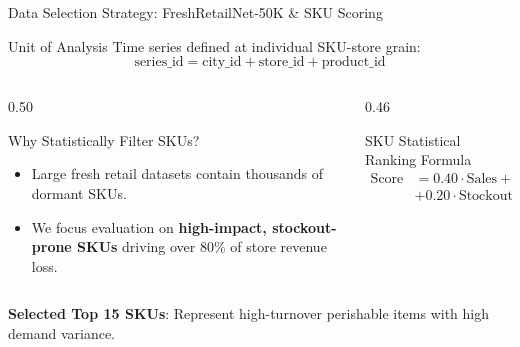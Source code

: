 \documentclass[10pt, aspectratio=169]{beamer}
\begin{document}
\begin{frame}{Data Selection Strategy: FreshRetailNet-50K \& SKU Scoring}
  \begin{block}{Unit of Analysis}
    Time series defined at individual SKU-store grain: 
    $$\text{series\_id} = \text{city\_id} + \text{store\_id} + \text{product\_id}$$
  \end{block}

  \begin{columns}[T]
    \begin{column}{0.50\textwidth}
      \begin{block}{Why Statistically Filter SKUs?}
        \begin{itemize}
          \item Large fresh retail datasets contain thousands of dormant SKUs.
          \item We focus evaluation on \textbf{high-impact, stockout-prone SKUs} driving over 80\% of store revenue loss.
        \end{itemize}
      \end{block}
    \end{column}
    
    \begin{column}{0.46\textwidth}
      \begin{block}{SKU Statistical Ranking Formula}
        $$\begin{aligned}
          \text{Score} &= 0.40 \cdot \text{Sales} + 0.25 \cdot \text{StockoutHours} \\
          &+ 0.20 \cdot \text{StockoutDays} + 0.15 \cdot \text{SalesStd}
        \end{aligned}$$
      \end{block}
    \end{column}
  \end{columns}
  
  \vspace{4pt}
  \centering
  \small{\textbf{Selected Top 15 SKUs}: Represent high-turnover perishable items with high demand variance.}
\end{frame}
\end{document}
